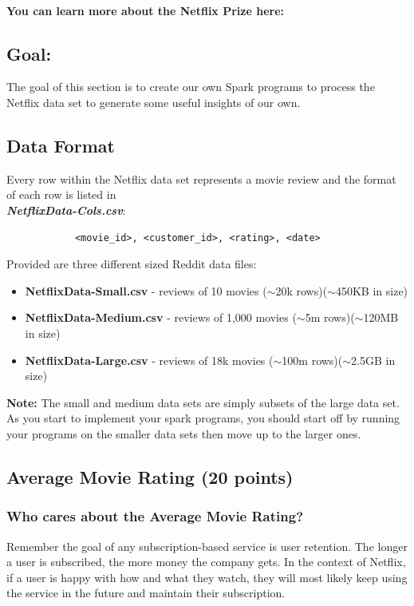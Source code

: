 \documentclass{article}
\begin{document}
\-\ \\ \noindent \textbf{You can learn more about the Netflix Prize here:} \href{https://en.wikipedia.org/wiki/Netflix_Prize}{\color{blue}{https://en.wikipedia.org/wiki/Netflix\_Prize}}


\subsection*{Goal:} The goal of this section is to create our own Spark programs to process the Netflix data set to generate some useful insights of our own.

\subsection*{Data Format}
Every row within the Netflix data set represents a movie review and the format of each row is listed in \\ \textbf{\textit{NetflixData-Cols.csv}}:

\large
\begin{verbatim}
            <movie_id>, <customer_id>, <rating>, <date>
\end{verbatim}
\normalsize


\noindent Provided are three different sized Reddit data files:
\begin{itemize}
    \item \textbf{NetflixData-Small.csv} - reviews of 10 movies ($\sim$20k rows)($\sim$450KB in size)
    \item \textbf{NetflixData-Medium.csv} - reviews of 1,000 movies ($\sim$5m rows)($\sim$120MB in size)
    \item \textbf{NetflixData-Large.csv} - reviews of 18k movies ($\sim$100m rows)($\sim$2.5GB in size)
\end{itemize}

\noindent \textbf{Note:} The small and medium data sets are simply subsets of the large data set. As you start to implement your spark programs, you should start off by running your programs on the smaller data sets then move up to the larger ones. 


\subsection{Average Movie Rating (20 points)}
\subsubsection*{Who cares about the Average Movie Rating?}
Remember the goal of any subscription-based service is user retention. The longer a user is subscribed, the more money the company gets. In the context of Netflix, if a user is happy with how and what they watch, they will most likely keep using the service in the future and maintain their subscription.
\end{document}
